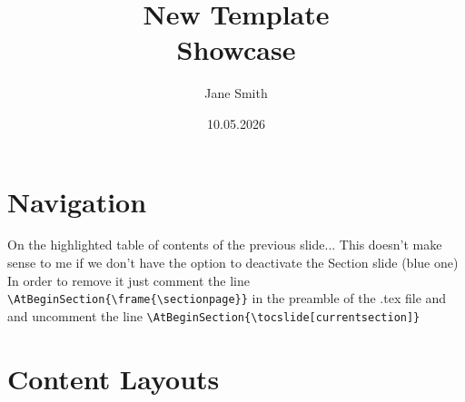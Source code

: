 \documentclass[aspectratio=169]{beamer}
\title{New Template\\[0.8ex]Showcase}
\author{Jane Smith}
\date{10.05.2026}
\begin{document}
\begin{frame}
  \titlepage
\end{frame}


\tocslide

\section{Navigation}
  \setcounter{framenumber}{1}


\tocslide[currentsection]

{
  On the highlighted table of contents of the previous slide...
}{
  This doesn't make sense to me if we don't have the option to deactivate the Section slide (blue one)\\[2em]
  In order to remove it just comment the line
  \texttt{\textbackslash AtBeginSection\{\textbackslash frame\{\textbackslash sectionpage\}\}}
  in the preamble of the .tex file and and uncomment the line
  \texttt{\textbackslash AtBeginSection\{\textbackslash tocslide[currentsection]\}}
}

\section{Content Layouts}

\end{document}
